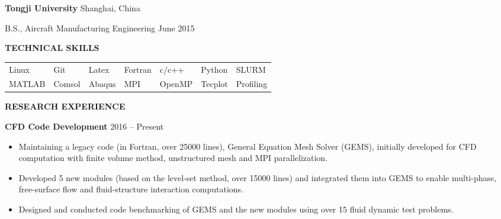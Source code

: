 \documentclass[11pt, letterpaper]{article}
\begin{document}
\textbf{Tongji University} 
\hfill
Shanghai, China

B.S., Aircraft Manufacturing Engineering \hfill June 2015

\vskip 9pt

% 
% 

\textbf{TECHNICAL SKILLS}

\fullrule

\begin{tabular}{@{} l l l l l l l @{}}
   Linux & Git & Latex & Fortran & c/c++ & Python & SLURM \\
   MATLAB & Comsol & Abaqus & MPI & OpenMP & Tecplot & Profiling
\end{tabular}

\vspace{9pt}

\textbf{RESEARCH EXPERIENCE}

\fullrule

\textbf{CFD Code Development} \hfill 2016 -- Present
\begin{itemize}[leftmargin=*, labelsep=5mm]
   \item Maintaining a legacy code (in Fortran, over 25000 lines), General Equation Mesh Solver
      (GEMS), initially developed for CFD computation with finite volume method, unstructured mesh
      and MPI parallelization.
   \item Developed 5 new modules (based on the level-set method, over 15000 lines) and integrated
      them into GEMS to enable multi-phase, free-surface flow and fluid-structure interaction
      computations.
   \item Designed and conducted code benchmarking of GEMS and the new modules using over 15 fluid
      dynamic test problems. 
\end{itemize}

\vspace{3pt}
\end{document}
